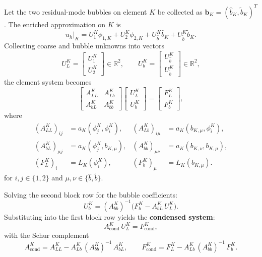 \documentclass[11pt]{article}
\newcommand{\R}{\mathbb{R}}
\theoremstyle{remark}
\begin{document}
Let the two residual-mode bubbles on element $K$ be collected as $\bm{b}_K = (\widehat{b}_K, \widetilde{b}_K)^T$. The enriched approximation on $K$ is
\begin{equation}
u_h\big|_K = U_1^K \phi_{1,K} + U_2^K \phi_{2,K} + U_{\widehat{b}}^K \widehat{b}_K + U_{\widetilde{b}}^K \widetilde{b}_K.
\end{equation}
Collecting coarse and bubble unknowns into vectors
\begin{equation}
U_L^K = \begin{bmatrix} U_1^K \\ U_2^K \end{bmatrix} \in \R^2, \qquad
U_b^K = \begin{bmatrix} U_{\widehat{b}}^K \\ U_{\widetilde{b}}^K \end{bmatrix} \in \R^2,
\end{equation}
the element system becomes
\begin{equation}\label{eq:element_system}
\begin{bmatrix}
A_{LL}^K & A_{Lb}^K \\
A_{bL}^K & A_{bb}^K
\end{bmatrix}
\begin{bmatrix}
U_L^K \\ U_b^K
\end{bmatrix}
=
\begin{bmatrix}
F_L^K \\ F_b^K
\end{bmatrix},
\end{equation}
where
\begin{align}
(A_{LL}^K)_{ij} &= a_K(\phi_j^K, \phi_i^K), & (A_{Lb}^K)_{i\mu} &= a_K(b_{K,\mu}, \phi_i^K), \\
(A_{bL}^K)_{\mu j} &= a_K(\phi_j^K, b_{K,\mu}), & (A_{bb}^K)_{\mu\nu} &= a_K(b_{K,\nu}, b_{K,\mu}), \\
(F_L^K)_i &= L_K(\phi_i^K), & (F_b^K)_\mu &= L_K(b_{K,\mu}).
\end{align}
for $i,j \in \{1,2\}$ and $\mu,\nu \in \{\widehat{b}, \widetilde{b}\}$.

Solving the second block row for the bubble coefficients:
\begin{equation}\label{eq:bubble_recovery}
U_b^K = (A_{bb}^K)^{-1}\bigl(F_b^K - A_{bL}^K\,U_L^K\bigr).
\end{equation}
Substituting into the first block row yields the \textbf{condensed system}:
\begin{equation}\label{eq:condensed}
A_{\mathrm{cond}}^K\,U_L^K = F_{\mathrm{cond}}^K,
\end{equation}
with the Schur complement
\begin{equation}\label{eq:schur}
A_{\mathrm{cond}}^K = A_{LL}^K - A_{Lb}^K\,(A_{bb}^K)^{-1}\,A_{bL}^K, \qquad
F_{\mathrm{cond}}^K = F_L^K - A_{Lb}^K\,(A_{bb}^K)^{-1}\,F_b^K.
\end{equation}
\end{document}
